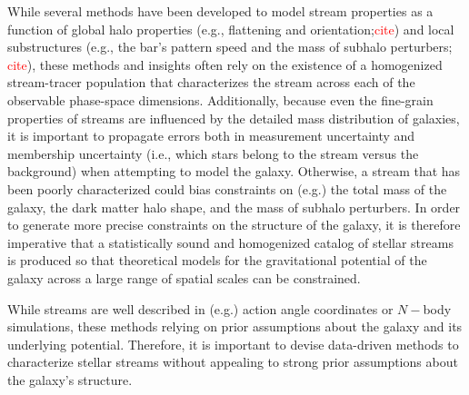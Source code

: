 \documentclass[twocolumn]{aastex631}
\newcommand{\TODO}[1]{{\textcolor{red}{#1}}}
\newcommand{\JN}[1]{\TODO{#1}}
\begin{document}
    While several methods have been developed to model stream properties as a function of global halo properties (e.g., flattening and orientation;\JN{cite}) and local substructures (e.g., the bar's pattern speed and the mass of subhalo perturbers; \JN{cite}), these methods and insights often rely on the existence of a homogenized stream-tracer population that characterizes the stream across each of the observable phase-space dimensions. Additionally, because even the fine-grain properties of streams are influenced by the detailed mass distribution of galaxies, it is important to propagate errors both in measurement uncertainty and membership uncertainty (i.e., which stars belong to the stream versus the background) when attempting to model the galaxy. Otherwise, a stream that has been poorly characterized could bias constraints on (e.g.) the total mass of the galaxy, the dark matter halo shape, and the mass of subhalo perturbers. In order to generate more precise constraints on the structure of the galaxy, it is therefore imperative that a statistically sound and homogenized catalog of stellar streams is produced so that theoretical models for the gravitational potential of the galaxy across a large range of spatial scales can be constrained. 

    While streams are well described in (e.g.) action angle coordinates or $N-$body simulations, these methods relying on prior assumptions about the galaxy and its underlying potential. Therefore, it is important to devise data-driven methods to characterize stellar streams without appealing to strong prior assumptions about the galaxy's structure. 
    
\end{document}
